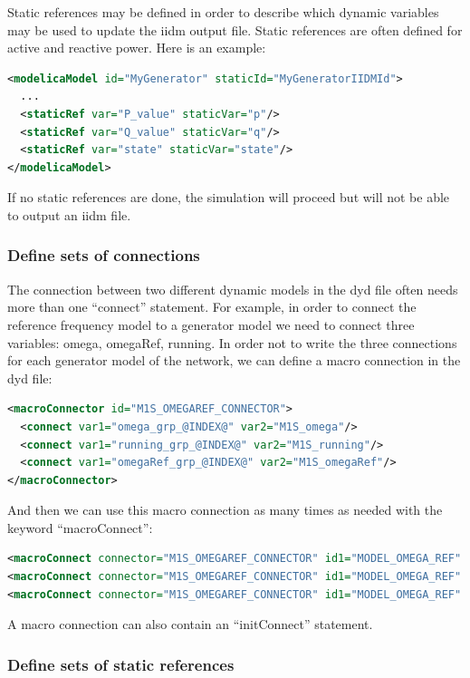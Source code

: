 \documentclass[a4paper, 12pt]{report}
\begin{document}
Static references may be defined in order to describe which dynamic variables may be used to update the iidm output file. Static references are often defined for active and reactive power. Here is an example:
\begin{lstlisting}[language=XML, morekeywords={staticRef}]
<modelicaModel id="MyGenerator" staticId="MyGeneratorIIDMId">
  ...
  <staticRef var="P_value" staticVar="p"/>
  <staticRef var="Q_value" staticVar="q"/>
  <staticRef var="state" staticVar="state"/>
</modelicaModel>
\end{lstlisting}

If no static references are done, the simulation will proceed but \Dynawo will not be able to output an iidm file.

\subsubsection{Define sets of connections}

The connection between two different dynamic models in the dyd file often needs more than one ``connect'' statement. For example,  in order to connect the reference frequency model to a generator model we need to connect three variables: omega, omegaRef, running. In order not to write the three connections for each generator model of the network, we can define a macro connection in the dyd file:
\begin{lstlisting}[language=XML, morekeywords={macroConnector}]
<macroConnector id="M1S_OMEGAREF_CONNECTOR">
  <connect var1="omega_grp_@INDEX@" var2="M1S_omega"/>
  <connect var1="running_grp_@INDEX@" var2="M1S_running"/>
  <connect var1="omegaRef_grp_@INDEX@" var2="M1S_omegaRef"/>
</macroConnector>
\end{lstlisting}

And then we can use this macro connection as many times as needed with the keyword ``macroConnect'':
\begin{lstlisting}[language=XML, morekeywords={macroConnect}]
<macroConnect connector="M1S_OMEGAREF_CONNECTOR" id1="MODEL_OMEGA_REF" index1="0" id2="Generator0"/>
<macroConnect connector="M1S_OMEGAREF_CONNECTOR" id1="MODEL_OMEGA_REF" index1="1" id2="Generator1"/>
<macroConnect connector="M1S_OMEGAREF_CONNECTOR" id1="MODEL_OMEGA_REF" index1="2" id2="Generator2"/>
\end{lstlisting}

A macro connection can also contain an ``initConnect'' statement.

\subsubsection{Define sets of static references}
\end{document}

